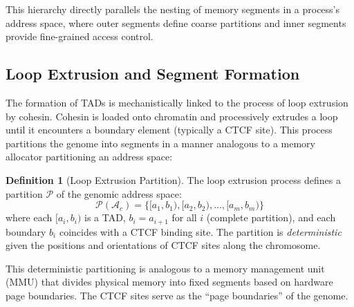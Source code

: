 \documentclass[12pt,a4paper]{article}
\theoremstyle{plain}
\theoremstyle{definition}
\newtheorem{definition}[theorem]{Definition}
\begin{document}
This hierarchy directly parallels the nesting of memory segments in a process's address space, where outer segments define coarse partitions and inner segments provide fine-grained access control.

\begin{center}
\end{center}

\subsection{Loop Extrusion and Segment Formation}

The formation of TADs is mechanistically linked to the process of loop extrusion by cohesin. Cohesin is loaded onto chromatin and processively extrudes a loop until it encounters a boundary element (typically a CTCF site). This process partitions the genome into segments in a manner analogous to a memory allocator partitioning an address space:

\begin{definition}[Loop Extrusion Partition]\label{def:loop-extrusion}
The loop extrusion process defines a partition $\mathcal{P}$ of the genomic address space:
\[
  \mathcal{P}(\mathcal{A}_c) = \{[a_1, b_1), [a_2, b_2), \ldots, [a_m, b_m)\}
\]
where each $[a_i, b_i)$ is a TAD, $b_i = a_{i+1}$ for all $i$ (complete partition), and each boundary $b_i$ coincides with a CTCF binding site. The partition is \emph{deterministic} given the positions and orientations of CTCF sites along the chromosome.
\end{definition}

This deterministic partitioning is analogous to a memory management unit (MMU) that divides physical memory into fixed segments based on hardware page boundaries. The CTCF sites serve as the ``page boundaries'' of the genome.


\end{document}
